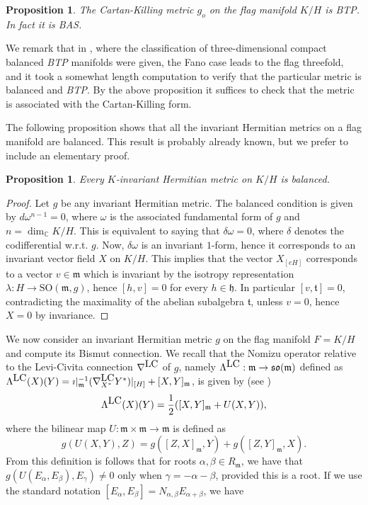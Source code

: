 \documentclass{amsart}
\numberwithin{equation}{section}
\newtheorem{proposition}[theorem]{Proposition}
\theoremstyle{definition}
\renewcommand{\1}{\mathds{1}}
\renewcommand{\a}{\alpha}
\renewcommand{\b}{\beta}
\newcommand{\g}{\gamma}
\newcommand{\gh}{\mathfrak h}
\newcommand{\gm}{\mathfrak m}
\newcommand{\gt}{\mathfrak t}
\newcommand{\so}{\mathfrak{so}}
\renewcommand{\>}{\rightarrow}
\begin{document}
\begin{proposition}
The Cartan-Killing metric $g_o$ on the flag manifold $K/H$ is {\rm BTP}. In fact it is {\rm BAS}.
\end{proposition}

 We remark that in \cite{ZhaoZ22}, where the classification of three-dimensional compact balanced {\em {\rm BTP}} manifolds were given, the Fano case leads to the flag threefold, and it took a somewhat length computation to verify that the particular metric is balanced and {\em {\rm BTP}}. By the above proposition it suffices to check that the metric is associated with the Cartan-Killing form.

The following proposition shows that all the invariant Hermitian metrics on a flag manifold are balanced. This result is probably already known, but we prefer to include an elementary proof.
\begin{proposition} Every $K$-invariant Hermitian metric on $K/H$ is balanced.
\end{proposition}
\begin{proof} Let $g$ be any invariant Hermitian metric. The balanced condition is given by $d\omega^{n-1}=0$, where $\omega$ is the associated fundamental form of $g$ and $n=\dim_{\mathbb C}K/H$. This is equivalent to saying that $\delta\omega=0$, where $\delta$ denotes the codifferential w.r.t. $g$. Now, $\delta\omega$ is an invariant $1$-form, hence it corresponds to an invariant vector field $X$ on $K/H$. This implies that the vector $X_{[eH]}$ corresponds to a vector $v\in\gm$ which is invariant by the isotropy representation $\lambda:H\to \mbox{SO}(\gm,g)$, hence $[h,v]=0$ for every $h\in \gh$. In particular $[v,\gt]=0$, contradicting the maximality of the abelian subalgebra $\gt$, unless $v=0$, hence $X=0$ by invariance. \end{proof}
We now consider an invariant Hermitian metric $g$ on the flag manifold $F= K/H$ and compute its Bismut connection. We recall that the Nomizu operator relative to the Levi-Civita connection $\nabla^{\mbox{\tiny LC}}$ of $g$, namely $\Lambda^{\mbox{\tiny LC}}:\gm\to\so(\gm)$ defined as $\Lambda^{\mbox{\tiny LC}}(X)(Y) = \imath|_{\gm}^{-1}(\nabla^{\mbox{\tiny LC}}_{X^*}Y^*)|_{[H]}+[X,Y]_\gm$, is given by (see \cite{KN})
$$\Lambda^{\mbox{\tiny LC}}(X)(Y) = \frac 12 ([X,Y]_\gm + U(X,Y)),$$
where the bilinear map $U:\gm\times\gm\to\gm$ is defined as
$$g(U(X,Y),Z) = g([Z,X]_\gm,Y) + g([Z,Y]_\gm,X).$$
From this definition is follows that for roots $\a,\b\in R_\gm$, we have that $g(U(E_\a,E_\b),E_\g)\neq 0$ only when $\g=-\a-\b$, provided this is a root. If we use the standard notation $[E_\a,E_\b]=N_{\a,\b}E_{\a+\b}$, we have
\end{document}
